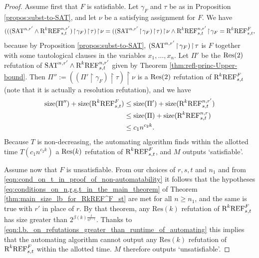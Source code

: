 \begin{proof}
Assume first that $F$ is satisfiable. Let $\gamma_F$ and $\tau$ be as in Proposition \ref{propos:subst-to-SAT}, and let $\nu$ be a satisfying assignment for $F$. We have
\begin{equation*}
(((\textnormal{SAT}^{n,r'} \land \textnormal{R}^k\textnormal{REF}^{n,r'}_{s,t}) \! \restriction \!  \gamma_F) \! \restriction \!  \tau) \! \restriction \!  \nu 
= ((\textnormal{SAT}^{n,r'} \! \restriction \! \gamma_F) \! \restriction \!  \tau) \! \restriction \!  \nu  \land \textnormal{R}^k\textnormal{REF}^{n,r'}_{s,t} \! \restriction \!  \gamma_F 
= \textnormal{R}^k\textnormal{REF}^{F}_{s,t},
\end{equation*}
because by Proposition \ref{propos:subst-to-SAT}, $( \textnormal{SAT}^{n,r'} \! \restriction \! \gamma_F ) \! \restriction \! \tau$ is $F$ together with some tautological clauses in the variables $x_1,\ldots, x_n$. 
Let $\Pi'$ be the $\textnormal{Res}(2)$ refutation of $\textnormal{SAT}^{n,r'} \land \textnormal{R}^k\textnormal{REF}^{n,r'}_{s,t}$ given by Theorem \ref{thm:refl-princ-Upper-bound}. 
Then $\Pi'' := ((\Pi' \! \restriction \!  \gamma_F) \! \restriction \!  \tau) \! \restriction \!  \nu$ is a $\textnormal{Res}(2)$ refutation of $\textnormal{R}^k\textnormal{REF}^{F}_{s,t}$ (note that it is actually a resolution refutation), and we have
\begin{align*}
\textnormal{size}(\Pi'') + \textnormal{size}(\textnormal{R}^k\textnormal{REF}^{F}_{s,t}) 
& \leq \textnormal{size}(\Pi') + \textnormal{size}(\textnormal{R}^k\textnormal{REF}^{n,r'}_{s,t}) \\
& \leq \textnormal{size}(\Pi) + \textnormal{size}(\textnormal{R}^k\textnormal{REF}^{n,r}_{s,t}) \\
& \leq c_1 n ^{c_2 k}.
\end{align*}
Because $T$ is non-decreasing, the automating algorithm finds within the allotted time $T(c_1 n^{c_2 k})$ a $\textnormal{Res}(k)$ refutation of $\textnormal{R}^k\textnormal{REF}^{F}_{s,t}$, and $M$ outputs `satisfiable'. 

Assume now that $F$ is unsatisfiable. From our choices of $r,s,t$ and $n_1$ and from \eqref{eqn:cond_on_t_in_proof_of_non-automatability} it follows that the hypotheses \eqref{eq:conditions_on_n,r,s,t_in_the_main_theorem} 
 of Theorem \ref{thm:main_size_lb_for_RkREF^F_st} are met for all $n \geq n_1$, and the same is true with $r'$ in place of $r$. By that theorem, any $\text{Res}(k)$ refutation of $\textnormal{R}^k\textnormal{REF}^{F}_{s,t}$ has size greater than $2^{\beta(k) \frac{t}{n^{k-1}}}$. Thanks to \eqref{eqn:l.b._on_refutations_greater_than_runtime_of_automating} this implies that the automating algorithm cannot output any $\text{Res}(k)$ refutation of $\textnormal{R}^k\textnormal{REF}^{F}_{s,t}$ within the allotted time. $M$ therefore outputs `unsatisfiable'. 
\end{proof}

























